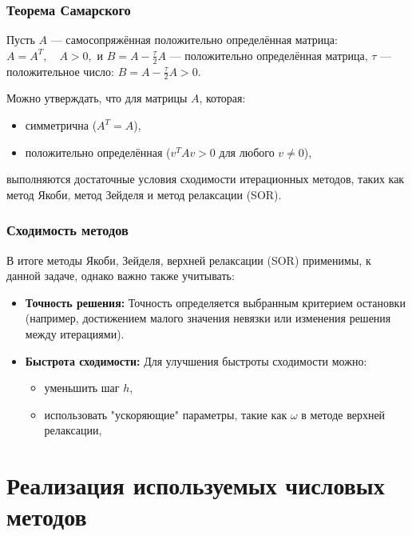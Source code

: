 \documentclass[a4paper, fleqn]{report}
\begin{document}
\subsection*{Теорема Самарского}
Пусть $A$ — самосопряжённая положительно определённая матрица:  
$A = A^T, \quad A > 0,$  
и $B = A - \frac{\tau}{2} A$ — положительно определённая матрица, $\tau$ — положительное число:  
$B = A - \frac{\tau}{2} A > 0.$

Можно утверждать, что для матрицы $A$, которая:
\begin{itemize}
    \item симметрична ($A^T = A$),
    \item положительно определённая ($v^T A v > 0$ для любого $v \neq 0$),
\end{itemize}
выполняются достаточные условия сходимости итерационных методов, таких как метод Якоби, метод Зейделя и метод релаксации (SOR). 

\subsection*{Сходимость методов}
В итоге методы Якоби, Зейделя, верхней релаксации (SOR) применимы, к данной задаче, однако важно также учитывать:
\begin{itemize}
    \item \textbf{Точность решения:} Точность определяется выбранным критерием остановки (например, достижением малого значения невязки или изменения решения между итерациями).
    \item \textbf{Быстрота сходимости:} Для улучшения быстроты сходимости можно:
    \begin{itemize}
        \item уменьшить шаг $h$,
        \item использовать "ускоряющие" параметры, такие как $\omega$ в методе верхней релаксации,
    \end{itemize}
\end{itemize}

\chapter{Реализация используемых числовых методов}
\end{document}
